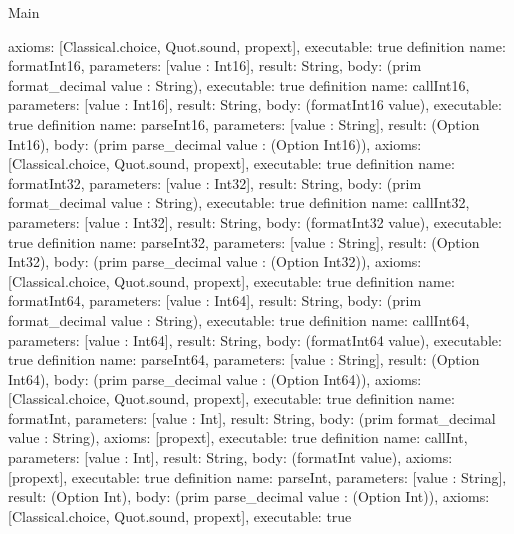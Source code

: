 \begin{lexlean}{Main}
\begin{semanticmodule}
{  axioms: [Classical.choice, Quot.sound, propext],
  executable: true
}
definition{
  name: formatInt16,
  parameters: [value : Int16],
  result: String,
  body: (prim format_decimal value : String),
  executable: true
}
definition{
  name: callInt16,
  parameters: [value : Int16],
  result: String,
  body: (formatInt16 value),
  executable: true
}
definition{
  name: parseInt16,
  parameters: [value : String],
  result: (Option Int16),
  body: (prim parse_decimal value : (Option Int16)),
  axioms: [Classical.choice, Quot.sound, propext],
  executable: true
}
definition{
  name: formatInt32,
  parameters: [value : Int32],
  result: String,
  body: (prim format_decimal value : String),
  executable: true
}
definition{
  name: callInt32,
  parameters: [value : Int32],
  result: String,
  body: (formatInt32 value),
  executable: true
}
definition{
  name: parseInt32,
  parameters: [value : String],
  result: (Option Int32),
  body: (prim parse_decimal value : (Option Int32)),
  axioms: [Classical.choice, Quot.sound, propext],
  executable: true
}
definition{
  name: formatInt64,
  parameters: [value : Int64],
  result: String,
  body: (prim format_decimal value : String),
  executable: true
}
definition{
  name: callInt64,
  parameters: [value : Int64],
  result: String,
  body: (formatInt64 value),
  executable: true
}
definition{
  name: parseInt64,
  parameters: [value : String],
  result: (Option Int64),
  body: (prim parse_decimal value : (Option Int64)),
  axioms: [Classical.choice, Quot.sound, propext],
  executable: true
}
definition{
  name: formatInt,
  parameters: [value : Int],
  result: String,
  body: (prim format_decimal value : String),
  axioms: [propext],
  executable: true
}
definition{
  name: callInt,
  parameters: [value : Int],
  result: String,
  body: (formatInt value),
  axioms: [propext],
  executable: true
}
definition{
  name: parseInt,
  parameters: [value : String],
  result: (Option Int),
  body: (prim parse_decimal value : (Option Int)),
  axioms: [Classical.choice, Quot.sound, propext],
  executable: true
}
\end{semanticmodule}
\end{lexlean}
